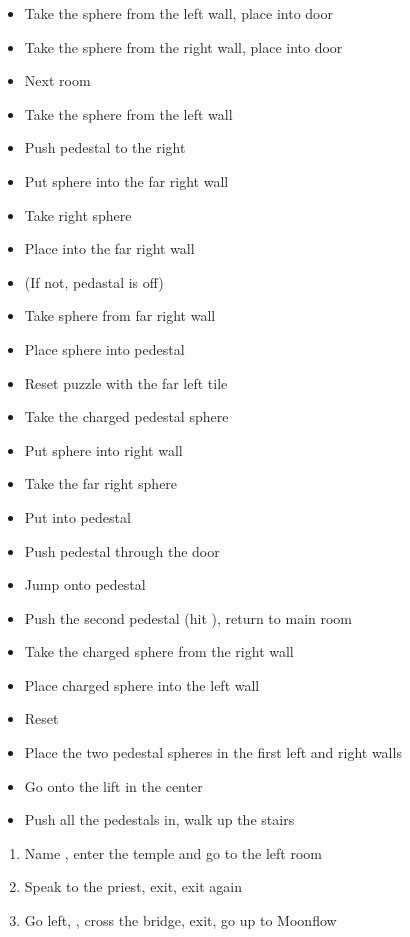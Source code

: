 \begin{trial}
    \begin{itemize}
        \item Take the sphere from the left wall, place into door
        \item Take the sphere from the right wall, place into door
        \item Next room
        \item Take the sphere from the left wall
        \item Push pedestal to the right
        \item Put sphere into the far right wall
        \item Take right sphere
        \item Place into the far right wall
        \item \cs (If not, pedastal is off)
        \item Take sphere from far right wall
        \item Place sphere into pedestal
        \item Reset puzzle with the far left tile
        \item Take the charged pedestal sphere
        \item Put sphere into right wall
        \item Take the far right sphere
        \item Put into pedestal
        \item Push pedestal through the door
        \item Jump onto pedestal
        \item Push the second pedestal (hit \Confirm), return to main room
        \item Take the charged sphere from the right wall
        \item Place charged sphere into the left wall
        \item Reset
        \item Place the two pedestal spheres in the first left and right walls
        \item Go onto the lift in the center
        \item Push all the pedestals in, walk up the stairs
    \end{itemize}
\end{trial}
\begin{enumerate}[resume]
    \item Name \ixion, enter the temple and go to the left room
    \item Speak to the priest, exit, exit again
    \item Go left, , cross the bridge, exit, go up to Moonflow
\end{enumerate}
\wincb\losscb\bothcb
